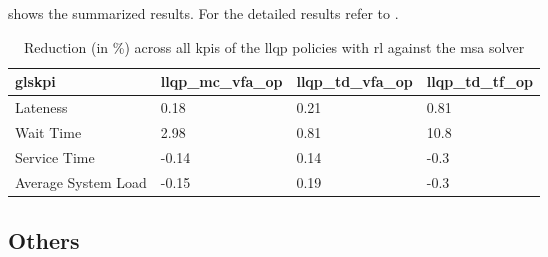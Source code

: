 \documentclass{seal_thesis}
\begin{document}
\begin{table}[!ht]
\centering
{}
\caption{Overview of developed \gls{llqp} policies with \gls{rl}}
\label{tab:rl_llqp_policies_overview}
\end{table}

 shows the summarized results. For the detailed results refer to .

\begin{table}[!ht]
\centering
\begin{tabular}{@{}llll@{}}
\toprule
gls{kpi}                 & llqp\_mc\_vfa\_op & llqp\_td\_vfa\_op & llqp\_td\_tf\_op \\ \midrule
Lateness            & 0.18                  & 0.21                  & 0.81                 \\
Wait Time           & 2.98                  & 0.81                  & 10.8                 \\
Service Time        & -0.14                  & 0.14                  & -0.3                 \\
Average System Load & -0.15                  & 0.19                  & -0.3                 \\ \bottomrule
\end{tabular}
\caption{Reduction (in \%) across all \glspl{kpi} of the \gls{llqp} policies with \gls{rl} against the \gls{msa} solver}
\label{tab:rl_llqp_kpis_comp_gain}
\end{table}

\subsection{Others}
\label{subsec:rl_others}
\end{document}

